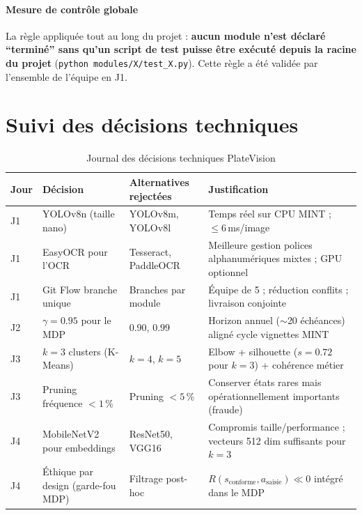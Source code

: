 \documentclass[12pt,a4paper]{article}
\begin{document}
\paragraph{Mesure de contr\^{o}le globale}
La r\`{e}gle appliqu\'{e}e tout au long du projet : \textbf{aucun module
n'est d\'{e}clar\'{e} ``termin\'{e}'' sans qu'un script de test puisse
\^{e}tre ex\'{e}cut\'{e} depuis la racine du projet} (\texttt{python
modules/X/test\_X.py}). Cette r\`{e}gle a \'{e}t\'{e} valid\'{e}e par
l'ensemble de l'\'{e}quipe en J1.

\section{Suivi des d\'{e}cisions techniques}
\label{sec:gp:decisions}

\begin{table}[H]
\centering
\caption{Journal des d\'{e}cisions techniques PlateVision}
\label{tab:gp:decisions}
\begin{tabular}{p{1cm}p{4.5cm}p{4cm}p{4cm}}
\toprule
\textbf{Jour} & \textbf{D\'{e}cision} & \textbf{Alternatives reject\'{e}es} & \textbf{Justification} \\
\midrule
J1 & YOLOv8n (taille nano)
   & YOLOv8m, YOLOv8l
   & Temps r\'{e}el sur CPU MINT ; $\leq 6$\,ms/image \\
J1 & EasyOCR pour l'OCR
   & Tesseract, PaddleOCR
   & Meilleure gestion polices alphanumériques mixtes ; GPU optionnel \\
J1 & Git Flow branche unique
   & Branches par module
   & \'{E}quipe de 5 ; r\'{e}duction conflits ; livraison conjointe \\
J2 & $\gamma = 0.95$ pour le MDP
   & $0.90$, $0.99$
   & Horizon annuel ($\sim$20 \'{e}ch\'{e}ances) align\'{e} cycle vignettes MINT \\
J3 & $k = 3$ clusters (K-Means)
   & $k = 4$, $k = 5$
   & Elbow + silhouette ($s = 0.72$ pour $k=3$) + coh\'{e}rence m\'{e}tier \\
J3 & Pruning fr\'{e}quence $< 1\,\%$
   & Pruning $< 5\,\%$
   & Conserver \'{e}tats rares mais op\'{e}rationnellement importants (fraude) \\
J4 & MobileNetV2 pour embeddings
   & ResNet50, VGG16
   & Compromis taille/performance ; vecteurs 512 dim suffisants pour $k=3$ \\
J4 & \'{E}thique par design (garde-fou MDP)
   & Filtrage post-hoc
   & $R(s_{\text{conforme}}, a_{\text{saisie}}) \ll 0$ int\'{e}gr\'{e} dans le MDP \\
\bottomrule
\end{tabular}
\end{table}
\end{document}

